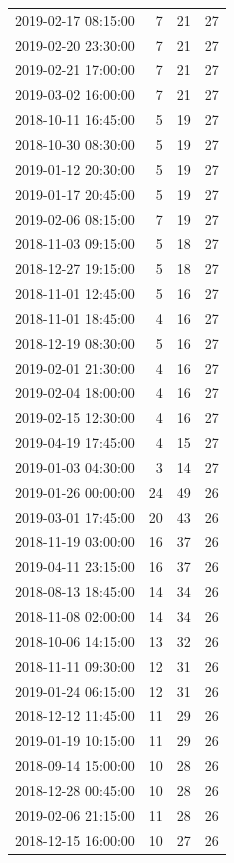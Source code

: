 \begin{tabular}{lrrr}
2019-02-17 08:15:00 & 7 & 21 & 27 \\
2019-02-20 23:30:00 & 7 & 21 & 27 \\
2019-02-21 17:00:00 & 7 & 21 & 27 \\
2019-03-02 16:00:00 & 7 & 21 & 27 \\
2018-10-11 16:45:00 & 5 & 19 & 27 \\
2018-10-30 08:30:00 & 5 & 19 & 27 \\
2019-01-12 20:30:00 & 5 & 19 & 27 \\
2019-01-17 20:45:00 & 5 & 19 & 27 \\
2019-02-06 08:15:00 & 7 & 19 & 27 \\
2018-11-03 09:15:00 & 5 & 18 & 27 \\
2018-12-27 19:15:00 & 5 & 18 & 27 \\
2018-11-01 12:45:00 & 5 & 16 & 27 \\
2018-11-01 18:45:00 & 4 & 16 & 27 \\
2018-12-19 08:30:00 & 5 & 16 & 27 \\
2019-02-01 21:30:00 & 4 & 16 & 27 \\
2019-02-04 18:00:00 & 4 & 16 & 27 \\
2019-02-15 12:30:00 & 4 & 16 & 27 \\
2019-04-19 17:45:00 & 4 & 15 & 27 \\
2019-01-03 04:30:00 & 3 & 14 & 27 \\
2019-01-26 00:00:00 & 24 & 49 & 26 \\
2019-03-01 17:45:00 & 20 & 43 & 26 \\
2018-11-19 03:00:00 & 16 & 37 & 26 \\
2019-04-11 23:15:00 & 16 & 37 & 26 \\
2018-08-13 18:45:00 & 14 & 34 & 26 \\
2018-11-08 02:00:00 & 14 & 34 & 26 \\
2018-10-06 14:15:00 & 13 & 32 & 26 \\
2018-11-11 09:30:00 & 12 & 31 & 26 \\
2019-01-24 06:15:00 & 12 & 31 & 26 \\
2018-12-12 11:45:00 & 11 & 29 & 26 \\
2019-01-19 10:15:00 & 11 & 29 & 26 \\
2018-09-14 15:00:00 & 10 & 28 & 26 \\
2018-12-28 00:45:00 & 10 & 28 & 26 \\
2019-02-06 21:15:00 & 11 & 28 & 26 \\
2018-12-15 16:00:00 & 10 & 27 & 26 \\

\end{tabular}
